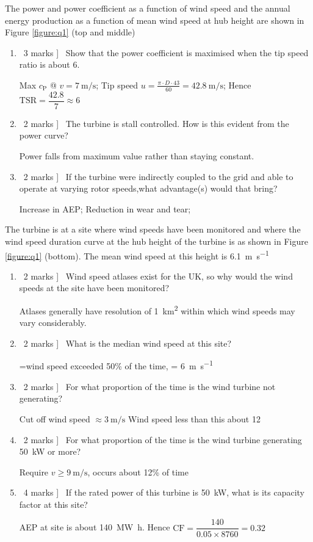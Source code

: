 \documentclass[a4paper,12pt,fleqn]{article}
\begin{document}
The power and power coefficient as a function of wind speed and the annual energy production as a function of mean wind
speed at hub height are shown in Figure \ref{figure:q1} (top and middle)



\begin{enumerate} [resume,label=\alph*)]
\item \lbrack\ 3 marks ] \ Show that the power coefficient is maximised when the tip speed ratio is about 6.\par
Max $c_\mathrm{P}$ @ $v=\SI{7}{\metre\per\second}$; Tip speed $u=\frac{\pi\cdot D\cdot43}{60}=\SI{42.8}{\metre\per\second}$; Hence $\mathrm{TSR}=\dfrac{42.8}{7}\approx 6 $
\item \lbrack\ 2 marks ] \ The turbine is stall controlled. How is this evident from the power curve?\par
Power falls from maximum value rather than staying constant.
\item \lbrack\ 2 marks ] \ If the turbine were indirectly coupled to the grid and able to operate at varying rotor speeds,what advantage(s) would that bring?\par
Increase in AEP; Reduction in wear and tear;
\end{enumerate}

The turbine is at a site where wind speeds have been monitored and where the wind speed duration curve at the hub height of the turbine is as shown in 
Figure \ref{figure:q1} (bottom). 
The mean wind speed at this height is \SI{6.1}{\metre\per\second}

\begin{enumerate} [resume,label=\alph*)]
\item \lbrack\ 2 marks ] \ Wind speed atlases exist for the UK, so why would the wind speeds at the site have been monitored?\par
Atlases generally have resolution of \SI{1}{\km\squared} within which wind speeds may vary considerably.
\item \lbrack\ 2 marks ] \ What is the median wind speed at this site?\par
=wind speed exceeded 50\% of the time, = \SI{6}{\metre\per\second}
\item \lbrack\ 2 marks ] \ For what proportion of the time is the wind turbine not generating?\par
Cut off wind speed $\approx \SI{3}{\metre\per\second}$ Wind speed less than this about 12%
\item \lbrack\ 2 marks ] \ For what proportion of the time is the wind turbine generating \SI{50}{\kilo\watt} or more?\par
Require $v\geq\SI{9}{\metre\per\second}$, occurs about 12\% of time
\item \lbrack\ 4 marks ] \ If the rated power of this turbine is \SI{50}{\kilo\watt}, what is its capacity factor at this site?\par
AEP at site is about \SI{140}{\mega\watt\hour}. Hence $\mathrm{CF}=\dfrac{140}{0.05\times 8760}=0.32$
\end{enumerate}
\end{document}
